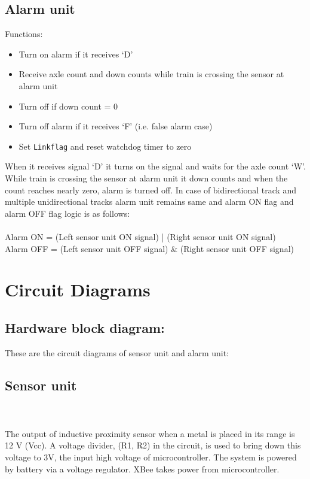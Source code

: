 \documentclass[aps,letterpaper,11pt]{article}
\begin{document}
\subsection{Alarm unit}
Functions:
\begin{itemize}
\item Turn on alarm if it receives `D'
\item Receive axle count and down counts while train is crossing the sensor at alarm unit
\item Turn off if down count = 0
\item Turn off alarm if it receives `F' (i.e. false alarm case)
\item Set \texttt{Linkflag} and reset watchdog timer to zero
\end{itemize}
When it receives signal `D' it turns on the signal and waits for the axle
count `W'. While train is crossing the sensor at alarm unit it down counts and
when the count reaches nearly zero, alarm is turned off.
In case of bidirectional track and multiple unidirectional tracks alarm unit
remains same and alarm ON flag and alarm OFF flag logic is as follows: \\ \\
Alarm ON = (Left sensor unit ON signal) | (Right sensor unit ON signal) \\
Alarm OFF = (Left sensor unit OFF signal) \& (Right sensor unit OFF signal) \\


\section{Circuit Diagrams}
\subsection{Hardware block diagram:}

\newpage

These are the circuit diagrams of sensor unit and alarm unit:
\subsection{Sensor unit}
\mbox{} \\ \\

The output of inductive proximity sensor when a metal is placed in its range is 12 V (Vcc). A voltage
divider, (R1, R2) in the circuit, is used to bring down this voltage to 3V, the input high voltage of
microcontroller. The system is powered by battery via a voltage regulator. XBee takes power from
microcontroller.\newpage
\end{document}
